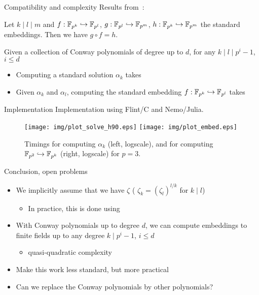 \documentclass[xcolor=x11names,compress, aspectratio=43]{beamer}
\begin{document}
\begin{frame}{Compatibility and complexity}
  Results from~:
  \begin{prop}[Compatibility]
    Let $k\mid l\mid m$ and $f:\mathbb{F}_{p^k}\hookrightarrow\mathbb{F}_{p^l}$,
    $g:\mathbb{F}_{p^l}\hookrightarrow\mathbb{F}_{p^m}$, 
    $h:\mathbb{F}_{p^k}\hookrightarrow\mathbb{F}_{p^m}$ the standard embeddings. Then we
    have $g\circ f = h$.
  \end{prop}
  \begin{prop}[Complexity]
    Given a collection of Conway polynomials of degree up to $d$, for any
  $k\mid l\mid p^i-1$, $i\leq d$
    \begin{itemize}
      \item Computing a standard solution $\alpha_k$ takes 
      \item Given $\alpha_k$ and $\alpha_l$, computing the standard embedding
        $f:\mathbb{F}_{p^k}\hookrightarrow \mathbb{F}_{p^l}$ takes 
    \end{itemize}
  \end{prop}
\end{frame}

\begin{frame}{Implementation}
  Implementation using Flint/C and Nemo/Julia.
 \begin{figure}[h]
  \centering
  \texttt{[image: img/plot\_solve\_h90.eps]}
  \texttt{[image: img/plot\_embed.eps]}
  \caption{Timings for computing $\alpha_k$ (left, logscale), and for computing
    $\mathbb{F}_{p^2}\hookrightarrow\mathbb{F}_{p^k}$
    (right, logscale) for $p=3$.}
\end{figure}
\end{frame}

\begin{frame}{Conclusion, open problems}
  \begin{itemize}
    \item We implicitly assume that we have  $\zeta$ (\ie
      $\zeta_k = (\zeta_{l})^{l/k}$ for $k\mid l$)
      \begin{itemize}
        \item In practice, this is done using 
      \end{itemize}
    \item With Conway polynomials up to degree $d$, we can compute embeddings to
      finite fields up to any degree $k\mid p^i-1$, $i\leq d$
      \begin{itemize}
        \item quasi-quadratic complexity
      \end{itemize}
  \end{itemize}
  \begin{itemize}
    \item Make this work less standard, but more practical
    \item Can we replace the Conway polynomials by other polynomials?
  \end{itemize}
\end{frame}

\begin{frame}
  \begin{center}
  \end{center}
\end{frame}
\end{document}
